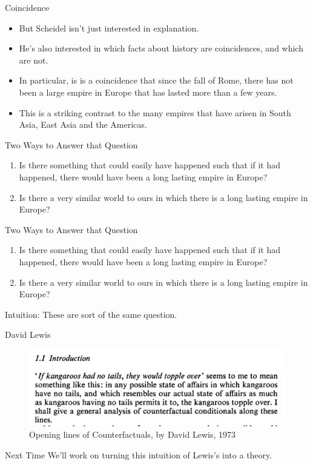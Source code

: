 \documentclass[
  ignorenonframetext,
]{beamer}
\providecommand{\tightlist}{%
  \setlength{\itemsep}{0pt}\setlength{\parskip}{0pt}}
\renewcommand{\,}{\text{, }}
\begin{document}
\begin{frame}{Coincidence}
\protect\hypertarget{coincidence}{}
\begin{itemize}
\tightlist
\item
  But Scheidel isn't just interested in explanation.
\item
  He's also interested in which facts about history are coincidences,
  and which are not. \pause
\item
  In particular, is is a coincidence that since the fall of Rome, there
  has not been a large empire in Europe that has lasted more than a few
  years.
\item
  This is a striking contrast to the many empires that have arisen in
  South Asia, East Asia and the Americas.
\end{itemize}
\end{frame}

\begin{frame}{Two Ways to Answer that Question}
\protect\hypertarget{two-ways-to-answer-that-question}{}
\begin{enumerate}[<+->]
\tightlist
\item
  Is there something that could easily have happened such that if it had
  happened, there would have been a long lasting empire in Europe?
\item
  Is there a very similar world to ours in which there is a long lasting
  empire in Europe?
\end{enumerate}
\end{frame}

\begin{frame}{Two Ways to Answer that Question}
\protect\hypertarget{two-ways-to-answer-that-question-1}{}
\begin{enumerate}
\tightlist
\item
  Is there something that could easily have happened such that if it had
  happened, there would have been a long lasting empire in Europe?
\item
  Is there a very similar world to ours in which there is a long lasting
  empire in Europe?
\end{enumerate}

Intuition: These are sort of the same question.
\end{frame}

\begin{frame}{David Lewis}
\protect\hypertarget{david-lewis}{}
\begin{figure}
\centering
\includegraphics{../images/Lewis-intro.png}
\caption{Opening lines of Counterfactuals, by David Lewis, 1973}
\end{figure}
\end{frame}

\begin{frame}{Next Time}
\protect\hypertarget{next-time}{}
We'll work on turning this intuition of Lewis's into a theory.
\end{frame}
\end{document}
